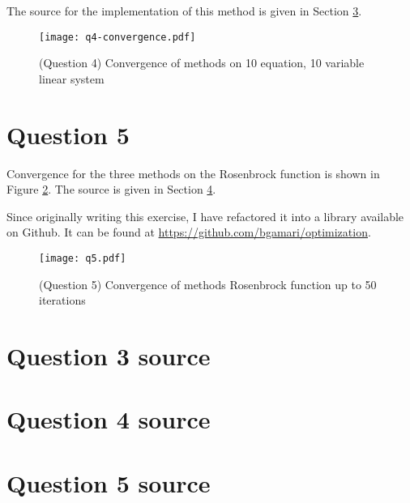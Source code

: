 \documentclass{article}
\begin{document}
The source for the implementation of this method is given in Section
\ref{Q4Source}.

\begin{figure}
  \center
  \texttt{[image: q4-convergence.pdf]}
  \caption{(Question 4) Convergence of methods on 10 equation, 10 variable linear system}
  \label{Fig:Q4Convergence}
\end{figure}

\section{Question 5}

Convergence for the three methods on the Rosenbrock function is shown
in Figure \ref{Fig:Q5Convergence}. The source is given in Section
\ref{Q5Source}.

Since originally writing this exercise, I have refactored it into a
library available on Github. It can be found at
\url{https://github.com/bgamari/optimization}.

\begin{figure}
  \center
  \texttt{[image: q5.pdf]}
  \caption{(Question 5) Convergence of methods Rosenbrock function up to 50 iterations}
  \label{Fig:Q5Convergence}
\end{figure}

\appendix

\section{Question 3 source}\label{Q3Source}


\section{Question 4 source}\label{Q4Source}


\section{Question 5 source}\label{Q5Source}

\end{document}
